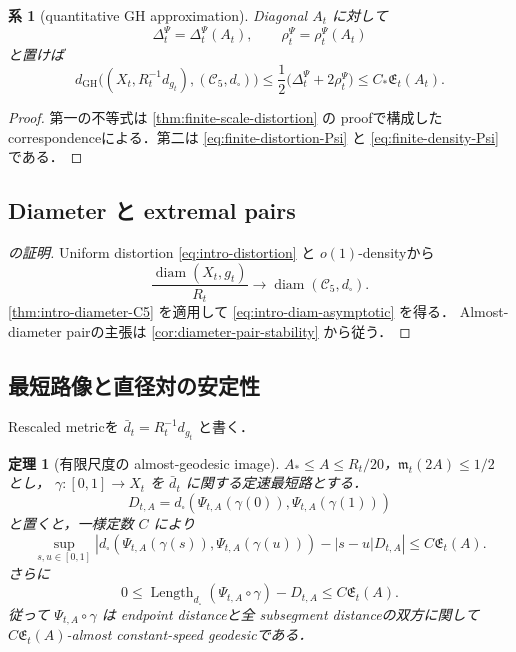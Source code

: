 \documentclass[a4paper,11pt]{ltjsarticle}
\numberwithin{equation}{section}
\theoremstyle{plain}
\newtheorem{theorem}{定理}[section]
\newtheorem{corollary}[corollary]{系}
\theoremstyle{definition}
\theoremstyle{remark}
\newcommand{\cC}{\mathcal C}
\newcommand{\diam}{\operatorname{diam}}
\newcommand{\Length}{\operatorname{Length}}
\newcommand{\GH}{\mathrm{GH}}
\begin{document}
\begin{corollary}[quantitative GH approximation]\label{cor:quantitative-GH}
Diagonal $A_t$ に対して
\[
 \Delta_t^\Psi=\Delta_t^\Psi(A_t),\qquad
 \rho_t^\Psi=\rho_t^\Psi(A_t)
\]
と置けば
\begin{equation}\label{eq:quantitative-GH-bound}
 d_{\GH}\bigl((X_t,R_t^{-1}d_{g_t}),(\cC_5,d_\square)\bigr)
 \le\frac12\bigl(\Delta_t^\Psi+2\rho_t^\Psi\bigr)
 \le C_*\mathfrak E_t(A_t).
\end{equation}
\end{corollary}

\begin{proof}
第一の不等式は \cref{thm:finite-scale-distortion} の proofで構成した correspondenceによる．第二は
\cref{eq:finite-distortion-Psi} と \cref{eq:finite-density-Psi} である．
\end{proof}

\subsection{Diameter と extremal pairs}

\begin{proof}[ の証明]
Uniform distortion \eqref{eq:intro-distortion} と $o(1)$-densityから
\[
 \frac{\diam(X_t,g_t)}{R_t}\longrightarrow\diam(\cC_5,d_\square).
\]
\cref{thm:intro-diameter-C5} を適用して \eqref{eq:intro-diam-asymptotic} を得る．
Almost-diameter pairの主張は \cref{cor:diameter-pair-stability} から従う．
\end{proof}

\subsection{最短路像と直径対の安定性}

Rescaled metricを $\bar d_t=R_t^{-1}d_{g_t}$ と書く．

\begin{theorem}[有限尺度の almost-geodesic image]\label{thm:finite-geodesic-image}
$A_\ast\le A\le R_t/20$，$\mathfrak m_t(2A)\le1/2$ とし，
$\gamma:[0,1]\to X_t$ を $\bar d_t$ に関する定速最短路とする．
\[
 D_{t,A}=d_\square(\Psi_{t,A}(\gamma(0)),\Psi_{t,A}(\gamma(1)))
\]
と置くと，一様定数 $C$ により
\begin{equation}\label{eq:finite-geodesic-profile}
 \sup_{s,u\in[0,1]}
 \left|
 d_\square(\Psi_{t,A}(\gamma(s)),\Psi_{t,A}(\gamma(u)))
 -|s-u|D_{t,A}
 \right|
 \le C\mathfrak E_t(A).
\end{equation}
さらに
\begin{equation}\label{eq:finite-geodesic-length-excess}
 0\le
 \Length_{d_\square}(\Psi_{t,A}\circ\gamma)-D_{t,A}
 \le C\mathfrak E_t(A).
\end{equation}
従って $\Psi_{t,A}\circ\gamma$ は endpoint distanceと全 subsegment distanceの双方に関して
$C\mathfrak E_t(A)$-almost constant-speed geodesicである．
\end{theorem}
\end{document}
